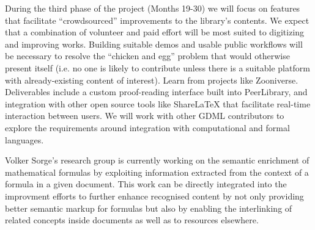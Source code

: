 \documentclass{article}
\begin{document}
During the third phase of the project (Months 19-30) we will focus on
features that facilitate ``crowdsourced'' improvements to the
library's contents.  We expect that a combination of volunteer and
paid effort will be most suited to digitizing and improving works.
Building suitable demos and usable public workflows will be necessary
to resolve the ``chicken and egg'' problem that would otherwise
present itself (i.e. no one is likely to contribute unless there is a
suitable platform with already-existing content of interest).  Learn from projects like Zooniverse.
%
Deliverables include a custom proof-reading interface built into PeerLibrary,
and integration with other open source tools like ShareLaTeX
that facilitate real-time interaction between users.  We will work with other GDML contributors to 
explore the requirements around integration with computational and formal languages.

Volker Sorge's research group is currently working on the semantic enrichment of
mathematical formulas by exploiting information extracted from the context of a
formula in a given document. This work can be directly integrated into the
improvment efforts to further enhance recognised content by not only providing
better semantic markup for formulas but also by enabling the interlinking of
related concepts inside documents as well as to resources elsewhere.
\end{document}
